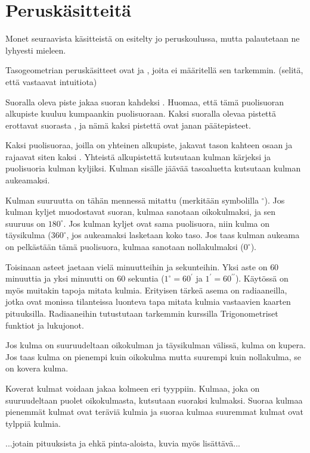 \section*{Peruskäsitteitä}

Monet seuraavista käsitteistä on esitelty jo peruskoulussa, mutta palautetaan ne lyhyesti
mieleen.

Tasogeometrian peruskäsitteet ovat  ja , joita ei
määritellä sen tarkemmin. (selitä, että vastaavat intuitiota)

Suoralla oleva piste jakaa suoran kahdeksi . Huomaa, että tämä puolisuoran
alkupiste kuuluu kumpaankin puolisuoraan. Kaksi suoralla olevaa pistettä erottavat suorasta
, ja nämä kaksi pistettä ovat janan päätepisteet.

Kaksi puolisuoraa, joilla on yhteinen alkupiste, jakavat tason kahteen osaan ja rajaavat siten kaksi . Yhteistä alkupistettä
kutsutaan kulman kärjeksi ja puolisuoria kulman kyljiksi. Kulman sisälle jäävää tasoaluetta
kutsutaan kulman aukeamaksi.

Kulman suuruutta on tähän mennessä mitattu  (merkitään symbolilla $^{\circ}$). Jos kulman kyljet muodostavat suoran,
kulmaa sanotaan oikokulmaksi, ja sen suuruus on $180^{\circ}$.
Jos kulman kyljet ovat sama puolisuora, niin kulma on täysikulma ($360^{\circ}$, jos aukeamaksi lasketaan
koko taso. Jos taas kulman aukeama on pelkästään tämä puolisuora, kulmaa sanotaan
nollakulmaksi ($0^{\circ}$).

Toisinaan asteet jaetaan vielä minuutteihin ja sekunteihin. Yksi aste on $60$ minuuttia ja
yksi minuutti on $60$ sekuntia ($1^{\circ} = 60^{\prime}$ ja $1^{\prime} = 
60^{\prime \prime}$).
Käytössä on myös muitakin tapoja mitata kulmia. Erityisen tärkeä asema on radiaaneilla, jotka
ovat monissa tilanteissa luonteva tapa mitata kulmia vastaavien kaarten pituuksilla. Radiaaneihin
tutustutaan tarkemmin kurssilla Trigonometriset funktiot ja lukujonot.


Jos kulma on
suuruudeltaan oikokulman ja täysikulman välissä, kulma on kupera. Jos taas kulma on pienempi
kuin oikokulma mutta suurempi kuin nollakulma, se on kovera kulma.

Koverat kulmat voidaan jakaa kolmeen eri tyyppiin. Kulmaa, joka on suuruudeltaan puolet
oikokulmasta, kutsutaan suoraksi kulmaksi. Suoraa kulmaa pienemmät kulmat ovat teräviä
kulmia ja suoraa kulmaa suuremmat kulmat ovat tylppiä kulmia.

...jotain pituuksista ja ehkä pinta-aloista, kuvia myös lisättävä...
